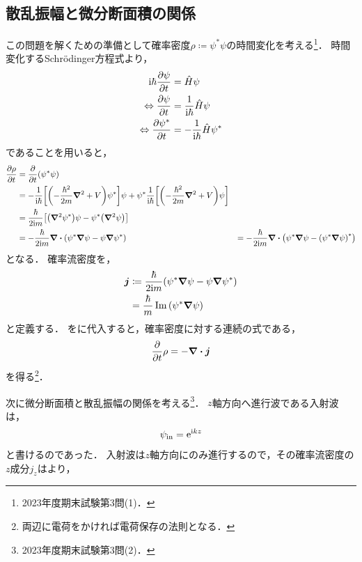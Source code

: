 \documentclass{report}
\begin{document}
  \subsection{散乱振幅と微分断面積の関係}
    この問題を解くための準備として確率密度$\rho \coloneqq \psi^{*} \psi$の時間変化を考える\footnote{2023年度期末試験第3問(1)．}．
    時間変化するSchr\"odinger方程式より，
    \begin{align}
      \mathrm{i}\hbar\pdv{\psi}{t} &= \hat{H}\psi \\ 
      \Leftrightarrow \pdv{\psi}{t} &= \frac{1}{\mathrm{i}\hbar}\hat{H}\psi \\ 
      \Leftrightarrow \pdv{\psi^*}{t} &= -\frac{1}{\mathrm{i}\hbar}\hat{H}\psi^*
    \end{align}
    であることを用いると，
    \begin{align}
      \pdv{\rho}{t} &= \pdv{t}(\psi^{*}\psi) \\
      &= -\frac{1}{\mathrm{i}\hbar}\qty[\qty(-\frac{\hbar^2}{2m}\grad^2 + V)\psi^{*}]\psi + \psi^{*}\frac{1}{\mathrm{i}\hbar}\qty[\qty(-\frac{\hbar^2}{2m}\grad^2 + V)\psi] \\
      &= \frac{\hbar}{2\mathrm{i} m}\qty[\qty(\grad^2 \psi^{*})\psi - \psi^{*}\qty(\grad^2\psi)] \\
      &= -\frac{\hbar}{2\mathrm{i} m}\div \qty(\psi^{*}\grad\psi - \psi \grad\psi^{*})
      &= -\frac{\hbar}{2\mathrm{i} m}\div \qty(\psi^{*}\grad\psi - \qty(\psi^{*}\grad\psi)^*)\label{prob-density}
    \end{align}
    となる．
    確率流密度を，
    \begin{align}
      \bm{j} &\coloneqq \frac{\hbar}{2\mathrm{i} m} \qty(\psi^{*}\grad\psi - \psi \grad\psi^{*}) \\
      &= \frac{\hbar}{m}\Im \qty(\psi^{*}\grad\psi)\label{prob-flow}
    \end{align}
    と定義する．
    をに代入すると，確率密度に対する連続の式である，
    \begin{align}
      \pdv{t} \rho = -\div\bm{j}
    \end{align}
    を得る\footnote{両辺に電荷をかければ電荷保存の法則となる． }．
    \par
    次に微分断面積と散乱振幅の関係を考える\footnote{2023年度期末試験第3問(2)．}．
    $z$軸方向へ進行波である入射波は，
    \begin{align}
      \psi_{\mathrm{in}} = \mathrm{e}^{\mathrm{i} kz}
    \end{align}
    と書けるのであった．
    入射波は$z$軸方向にのみ進行するので，その確率流密度の$z$成分$j_z$はより，
\end{document}
